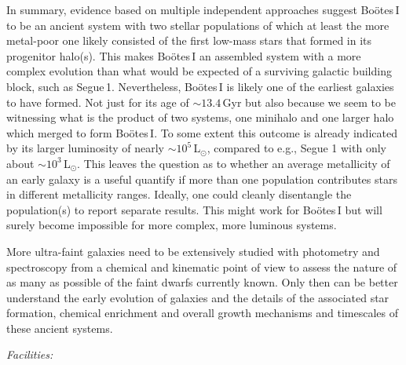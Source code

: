 \documentclass[]{emulateapj}
\begin{document}
In summary, evidence based on multiple independent approaches suggest
Bo\"otes\,I to be an ancient system with two stellar populations of
which at least the more metal-poor one likely consisted of the first
low-mass stars that formed in its progenitor halo(s). This makes
Bo\"otes\,I an assembled system with a more complex evolution than
what would be expected of a surviving galactic building block, such as
Segue\,1. Nevertheless, Bo\"otes\,I is likely one of the earliest
galaxies to have formed. Not just for its age of $\sim13.4$\,Gyr
\citep{brown14b} but also because we seem to be witnessing what is the
product of two systems, one minihalo and one larger halo which merged
to form Bo\"otes\,I. To some extent this outcome is already indicated
by its larger luminosity of nearly $\sim10^5$\,L$_{\odot}$, compared
to e.g., Segue 1 with only about $\sim10^3$\,L$_{\odot}$. This leaves
the question as to whether an average metallicity of an early galaxy is a
useful quantify if more than one population contributes stars in
different metallicity ranges. Ideally, one could cleanly disentangle
the population(s) to report separate results. This might work for
Bo\"otes\,I but will surely become impossible for more complex, more
luminous systems. 

More ultra-faint galaxies need to be extensively studied with
photometry and spectroscopy from a chemical and kinematic point of
view to assess the nature of as many as possible of the faint dwarfs currently
known. Only then can be better understand the early evolution of
galaxies and the details of the associated star formation, chemical
enrichment and overall growth mechanisms and timescales of these
ancient systems.
 



\textit{Facilities:} 

%
%      
\end{document}
